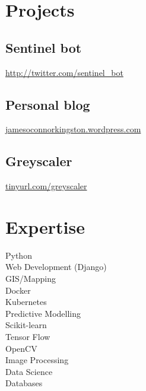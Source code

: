 \documentclass[]{JOC_CV}
\begin{document}
%
%

%
%



%
%

\begin{minipage}[t]{0.33\textwidth}


\section{Projects}\label{sec:projects}

\subsection{Sentinel bot}\label{subsec:sentinel-bot}
 \href{http://twitter.com/sentinel\_bot}{http://twitter.com/sentinel\_bot}
\subsection{Personal blog}\label{subsec:personal-blog}
\href{jamesoconnorkingston.wordpress.com}{jamesoconnorkingston.wordpress.com}
\subsection{Greyscaler}\label{subsec:greyscaler}
\href{tinyurl.com/greyscaler}{tinyurl.com/greyscaler}
\sectionsep



\section{Expertise}\label{sec:expertise}
Python \\
Web Development (Django) \\
GIS/Mapping \\
Docker \\
Kubernetes \\
Predictive Modelling \\
Scikit-learn \\
Tensor Flow \\
OpenCV \\
Image Processing \\
Data Science \\
Databases \\
\sectionsep


\end{minipage}
\end{document}
